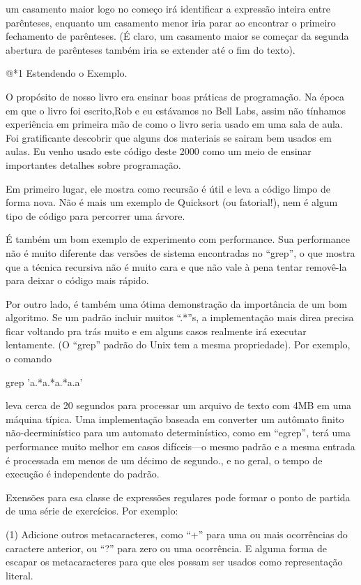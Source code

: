 um casamento maior logo no começo irá identificar a expressão inteira
entre parênteses, enquanto um casamento menor iria parar ao encontrar
o primeiro fechamento de parênteses. (É claro, um casamento maior se
começar da segunda abertura de parênteses também iria se extender até
o fim do texto).

@*1 Estendendo o Exemplo.

O propósito de nosso livro era ensinar boas práticas de
programação. Na época em que o livro foi escrito,Rob e eu estávamos no
Bell Labs, assim não tínhamos experiência em primeira mão de como o
livro seria usado em uma sala de aula. Foi gratificante descobrir que
alguns dos materiais se sairam bem usados em aulas. Eu venho usado
este código deste 2000 como um meio de ensinar importantes detalhes
sobre programação.

Em primeiro lugar, ele mostra como recursão é útil e leva a código
limpo de forma nova. Não é mais um exemplo de Quicksort (ou
fatorial!), nem é algum tipo de código para percorrer uma árvore.

É também um bom exemplo de experimento com performance. Sua
performance não é muito diferente das versões de sistema encontradas
no ``grep'', o que mostra que a técnica recursiva não é muito cara e
que não vale à pena tentar removê-la para deixar o código mais rápido.

Por outro lado, é também uma ótima demonstração da importância de um
bom algoritmo. Se um padrão incluir muitos ``.*''s, a implementação
mais direa precisa ficar voltando pra trás muito e em alguns casos
realmente irá executar lentamente. (O ``grep'' padrão do Unix tem a
mesma propriedade). Por exemplo, o comando

\alinhaverbatim
grep 'a.*a.*a.*a.a' 
\alinhanormal

leva cerca de 20 segundos para processar um arquivo de texto com 4MB
em uma máquina típica. Uma implementação baseada em converter um
autômato finito não-deerminístico para um automato determinístico,
como em ``egrep'', terá uma performance muito melhor em casos
difíceis---o mesmo padrão e a mesma entrada é processada em menos de
um décimo de segundo., e no geral, o tempo de execução é independente
do padrão.

Exensões para esa classe de expressões regulares pode formar o ponto
de partida de uma série de exercícios. Por exemplo:

(1) Adicione outros metacaracteres, como ``+'' para uma ou mais
ocorrências do caractere anterior, ou ``?'' para zero ou uma
ocorrência. E alguma forma de escapar os metacaracteres para que eles
possam ser usados como representação literal.

